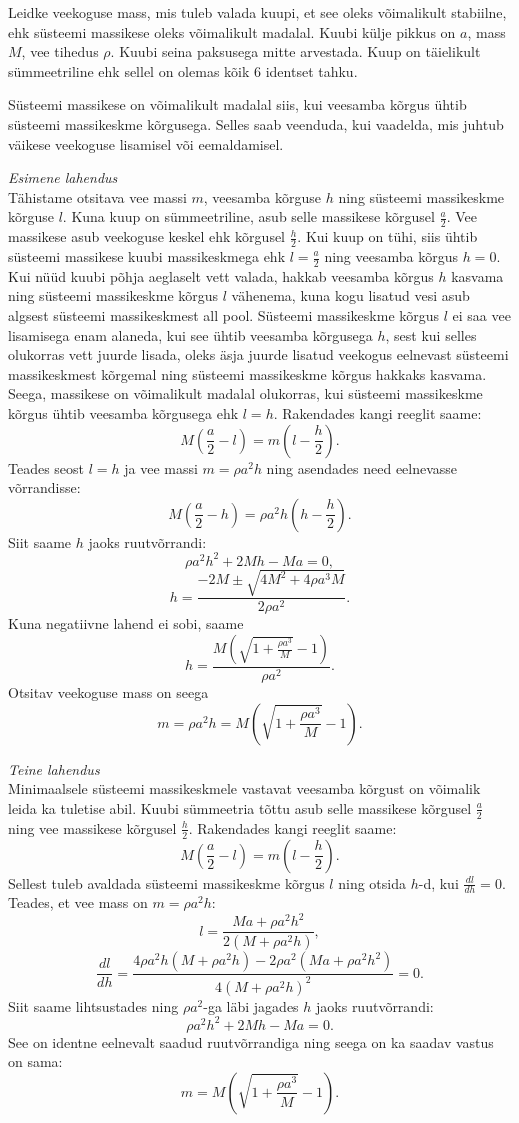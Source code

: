
Leidke veekoguse mass, mis tuleb valada kuupi, et see oleks võimalikult stabiilne, ehk süsteemi massikese oleks võimalikult madalal. Kuubi külje pikkus on $a$, mass $M$, vee tihedus $\rho$. Kuubi seina paksusega mitte arvestada. Kuup on täielikult sümmeetriline ehk sellel on olemas kõik 6 identset tahku.

\hint
Süsteemi massikese on võimalikult madalal siis, kui veesamba kõrgus ühtib süsteemi massikeskme kõrgusega. Selles saab veenduda, kui vaadelda, mis juhtub väikese veekoguse lisamisel või eemaldamisel.

\solu
\emph{Esimene lahendus}\\
Tähistame otsitava vee massi $m$, veesamba kõrguse $h$ ning süsteemi massikeskme kõrguse $l$. Kuna kuup on sümmeetriline, asub selle massikese kõrgusel $\frac{a}{2}$. Vee massikese asub veekoguse keskel ehk kõrgusel $\frac{h}{2}$. Kui kuup on tühi, siis ühtib süsteemi massikese kuubi massikeskmega ehk $l=\frac{a}{2}$ ning veesamba kõrgus $h=0$. Kui nüüd kuubi põhja aeglaselt vett valada, hakkab veesamba kõrgus $h$ kasvama ning süsteemi massikeskme kõrgus $l$ vähenema, kuna kogu lisatud vesi asub algsest süsteemi massikeskmest all pool. Süsteemi massikeskme kõrgus $l$ ei saa vee lisamisega enam alaneda, kui see ühtib veesamba kõrgusega $h$, sest kui selles olukorras vett juurde lisada, oleks äsja juurde lisatud veekogus eelnevast süsteemi massikeskmest kõrgemal ning süsteemi massikeskme kõrgus hakkaks kasvama. Seega, massikese on võimalikult madalal olukorras, kui süsteemi massikeskme kõrgus ühtib veesamba kõrgusega ehk $l=h$.
Rakendades kangi reeglit saame:
$$M(\frac{a}{2}-l)=m(l-\frac{h}{2}).$$ 
Teades seost $l=h$ ja vee massi $m=\rho a^2h$ ning asendades need eelnevasse võrrandisse:
$$M(\frac{a}{2}-h)=\rho a^2h(h-\frac{h}{2}).$$ 
Siit saame $h$ jaoks ruutvõrrandi:
$$\rho a^2h^2+2Mh-Ma=0,$$
$$h=\frac{-2M \pm \sqrt{4M^2+4\rho a^3M}}{2\rho a^2}.$$
Kuna negatiivne lahend ei sobi, saame
$$h=\frac{M(\sqrt{1+\frac{\rho a^3}{M}}-1)}{\rho a^2}.$$
Otsitav veekoguse mass on seega
$$m=\rho a^2h=M(\sqrt{1+\frac{\rho a^3}{M}}-1).$$

\emph{Teine lahendus}\\
Minimaalsele süsteemi massikeskmele vastavat veesamba kõrgust on võimalik leida ka tuletise abil. Kuubi sümmeetria tõttu asub selle massikese kõrgusel $\frac{a}{2}$ ning vee massikese kõrgusel $\frac{h}{2}$. Rakendades kangi reeglit saame: 
$$M(\frac{a}{2}-l)=m(l-\frac{h}{2}).$$ 
Sellest tuleb avaldada süsteemi massikeskme kõrgus $l$ ning otsida $h$-d, kui $\frac{dl}{dh}=0$. Teades, et vee mass on $m=\rho a^2h$:
$$l=\frac{Ma+\rho a^2h^2}{2(M+\rho a^2h)},$$ 
$$\frac{dl}{dh}=\frac{4\rho a^2h(M+\rho a^2h)-2\rho a^2(Ma+\rho a^2h^2)}{4(M+\rho a^2h)^2}=0.$$ 
Siit saame lihtsustades ning $\rho a^2$-ga läbi jagades $h$ jaoks ruutvõrrandi:
$$\rho a^2h^2+2Mh-Ma=0.$$ 
See on identne eelnevalt saadud ruutvõrrandiga ning seega on ka saadav vastus on sama:
$$m=M(\sqrt{1+\frac{\rho a^3}{M}}-1).$$

